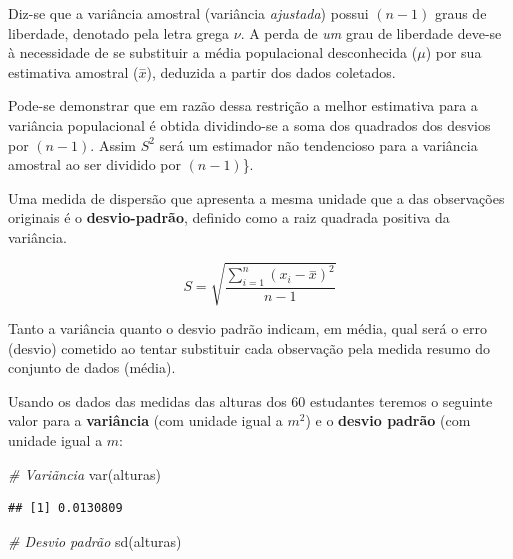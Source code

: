 \documentclass[
]{book}
\newenvironment{Shaded}{\begin{snugshade}}{\end{snugshade}}
\newcommand{\CommentTok}[1]{\textcolor[rgb]{0.56,0.35,0.01}{\textit{#1}}}
\newcommand{\FunctionTok}[1]{\textcolor[rgb]{0.00,0.00,0.00}{#1}}
\newcommand{\NormalTok}[1]{#1}
\begin{document}
Diz-se que a variância amostral (variância \emph{ajustada}) possui \((n-1)\) graus de liberdade, denotado pela letra grega \(\nu\). A perda de \emph{um} grau de liberdade deve-se à necessidade de se substituir a média populacional desconhecida (\(\mu\)) por sua estimativa amostral (\(\stackrel{-}{x}\)), deduzida a partir dos dados coletados.

\hfill\break

Pode-se demonstrar que em razão dessa restrição a melhor estimativa para a variância populacional é obtida dividindo-se a soma dos quadrados dos desvios por \((n-1)\). Assim \(S^{2}\) será um estimador não tendencioso para a variância amostral ao ser dividido por \((n-1)\)\}.

\hfill\break

Uma medida de dispersão que apresenta a mesma unidade que a das observações originais é o \textbf{desvio-padrão}, definido como a raiz quadrada positiva da variância.

\hfill\break

\[
S= \sqrt{\frac{\sum _{i=1}^{n}\left(x_{i}-\stackrel{-}{x}\right)^{2}}{n-1}}
\]

\hfill\break

Tanto a variância quanto o desvio padrão indicam, em média, qual será o erro (desvio) cometido ao tentar substituir cada observação pela medida resumo do conjunto de dados (média).

\hfill\break

Usando os dados das medidas das alturas dos 60 estudantes teremos o seguinte valor para a \textbf{variância} (com unidade igual a \(m^{2}\)) e o \textbf{desvio padrão} (com unidade igual a \(m\):

\hfill\break

\begin{Shaded}
\begin{Highlighting}[]
\CommentTok{\# Variãncia}
\FunctionTok{var}\NormalTok{(alturas)}
\end{Highlighting}
\end{Shaded}

\begin{verbatim}
## [1] 0.0130809
\end{verbatim}

\begin{Shaded}
\begin{Highlighting}[]
\CommentTok{\# Desvio padrão}
\FunctionTok{sd}\NormalTok{(alturas) }
\end{Highlighting}
\end{Shaded}
\end{document}
